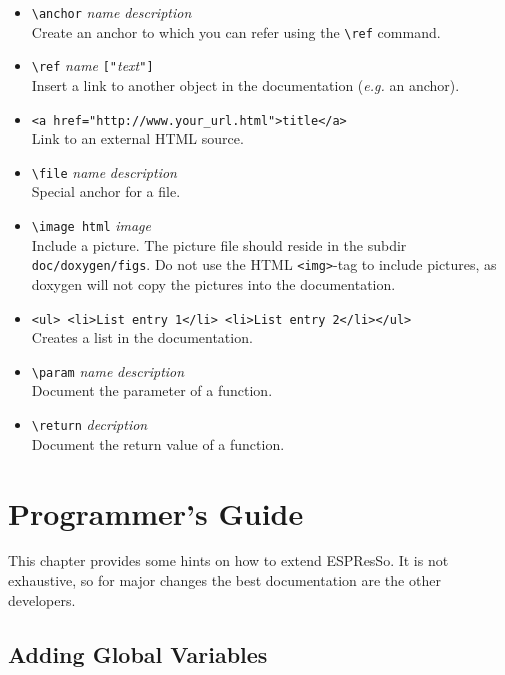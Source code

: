 \documentclass[
a4paper,                        %
11pt,                           %
twoside,                        %
footsepline,                    %
headsepline,                    %
headexclude,                    %
footexclude,                    %
pagesize,                       %
bibtotocnumbered,               %
idxtotoc                        %
]{scrreprt}
\newcommand{\es}{\mbox{\textsf{ESPResSo}}\xspace}
\newcommand{\eg}{\textit{e.g.}\xspace}
\begin{document}
\begin{itemize}
\item \verb!\anchor! \textit{name} \textit{description}\\
  Create an anchor to which you can refer using the \verb!\ref!
  command.
\item \verb!\ref! \textit{name} \texttt{["}\textit{text}\texttt{"]}\\
  Insert a link to another object in the documentation (\eg an
  anchor).
\item \verb!<a href="http://www.your_url.html">title</a>!\\
  Link to an external HTML source.
\item \verb!\file! \textit{name} \textit{description}\\
  Special anchor for a file.
\item \verb!\image html! \textit{image}\\
  Include a picture. The picture file should reside in the subdir
  \verb!doc/doxygen/figs!. Do not use the HTML \verb!<img>!-tag to
  include pictures, as doxygen will not copy the pictures into the
  documentation.
\item \verb!<ul> <li>List entry 1</li> <li>List entry 2</li></ul>!\\
  Creates a list in the documentation.
\item \verb!\param! \textit{name} \textit{description}\\
  Document the parameter of a function.
\item \verb!\return! \textit{decription}\\
  Document the return value of a function.
\end{itemize}

\chapter{Programmer's Guide}

This chapter provides some hints on how to extend \es.  It is not
exhaustive, so for major changes the best documentation are the other
developers.

\section{Adding Global Variables}
\end{document}
